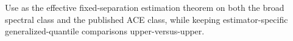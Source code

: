 Use as the effective fixed-separation estimation theorem on both the broad spectral class and the published ACE class, while keeping estimator-specific generalized-quantile comparisons upper-versus-upper.